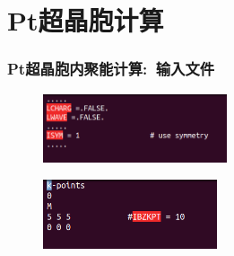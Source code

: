\section{{\rm Pt}超晶胞计算}\label{Sec:bulk-Pt}
\frame
{
	\frametitle{\textrm{Pt}超晶胞内聚能计算:~输入文件}
	{\fontsize{7.4pt}{5.2pt}}
\begin{figure}[h!]
\centering
\includegraphics[height=0.8in,viewport=0 20 340 118,clip]{Figures/Pt_Bulk-INCAR.png}
\caption{\fontsize{6.2pt}{5.2pt}}%
\label{Pt_Bulk-INCAR-modified}
\end{figure}
\begin{figure}[h!]
\centering
\vskip -3pt
\includegraphics[height=0.8in,viewport=0 20 240 108,clip]{Figures/Pt_Bulk-KPOINTS.png}
\caption{\fontsize{6.2pt}{5.2pt}}%
\label{Pt_Bulk-KPOINTS}
\end{figure}
{\fontsize{6.2pt}{5.2pt}}%
}

